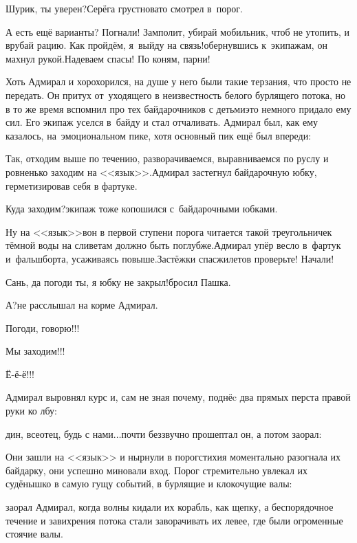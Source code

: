 \diagdash Шурик, ты уверен?\mdash Серёга грустновато смотрел в~порог.

\diagdash А есть ещё варианты? Погнали! Замполит, убирай мобильник, чтоб не утопить, и врубай рацию. Как пройдём, я~выйду на связь!\mdash обернувшись к~экипажам, он махнул рукой.\mdash Надеваем спасы! По коням, парни!

Хоть Адмирал и хорохорился, на душе у него были такие терзания, что просто не передать. Он притух от~уходящего в неизвестность белого бурлящего потока, но в то же время вспомнил про тех байдарочников с детьми\mdash это немного придало ему сил. Его экипаж уселся в~байду и стал отчаливать. Адмирал был, как ему казалось, на~эмоциональном пике, хотя основный пик ещё был впереди:

\diagdash Так, отходим выше по течению, разворачиваемся, выравниваемся по руслу и ровненько заходим на <<язык>>.\mdash Адмирал застегнул байдарочную юбку, герметизировав себя в фартуке.

\diagdash Куда заходим?\mdash экипаж тоже копошился с~байдарочными юбками.

\diagdash Ну на <<язык>>\mdash вон в первой ступени порога читается такой треугольничек тёмной воды на сливе\mdash там должно быть поглубже.\mdash Адмирал упёр весло в~фартук и~фальшборта, усаживаясь повыше.\mdash Застёжки спасжилетов проверьте! Начали!

\diagdash Сань, да погоди ты, я юбку не закрыл!\mdash бросил Пашка.

\diagdash А?\mdash не расслышал на корме Адмирал.

\diagdash Погоди, говорю!!!

\diagdash Мы заходим!!!

\diagdash Ё-ё-ё!!!

Адмирал выровнял курс и, сам не зная почему, поднёc два прямых перста правой руки ко лбу:

дин, всеотец, будь с нами$\ldots$\mdash почти беззвучно прошептал он, а потом заорал:

Они зашли на <<язык>> и нырнули в порог\mdash стихия моментально разогнала их байдарку, они успешно миновали вход. Порог стремительно увлекал их судёнышко в самую гущу событий, в бурлящие и клокочущие валы:

\mdash заорал Адмирал, когда волны кидали их корабль, как щепку, а беспорядочное течение и завихрения потока стали заворачивать их левее, где были огроменные стоячие валы. 

